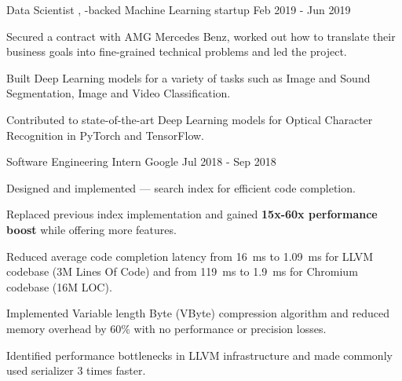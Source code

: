 \begin{cventries}
  \cventry
    {Data Scientist}
    {,
     -backed Machine Learning
     startup}
    {}
    {Feb 2019 - Jun 2019}
    {
      \begin{cvitems}
        \item Secured a contract with AMG Mercedes Benz, worked out how to
          translate their business goals into fine-grained technical problems
          and led the project.
        \item Built Deep Learning models for a variety of tasks such as Image
	  and Sound Segmentation, Image and Video Classification.
        \item Contributed to state-of-the-art Deep Learning models for Optical
          Character Recognition in PyTorch and TensorFlow.
      \end{cvitems}
    }

  \cventry
    {Software Engineering Intern}
    {Google}
    {}
    {Jul 2018 - Sep 2018}
    {
      \begin{cvitems}
        \item Designed and implemented
          --- search index for efficient code completion.
        \item Replaced previous index implementation and gained
          \textbf{15x-60x performance boost} while offering more features.
        \item Reduced average code completion latency from \SI{16}{\ms} to
          \SI{1.09}{\ms} for LLVM codebase (3M Lines Of Code) and from
          \SI{119}{\ms} to \SI{1.9}{\ms} for Chromium codebase (16M LOC).
        \item Implemented Variable length Byte (VByte) compression algorithm
	  and reduced memory overhead by 60\% with no performance or precision
	  losses.
        \item Identified performance bottlenecks in LLVM infrastructure and made
	  commonly used serializer 3 times faster.
      \end{cvitems}
    }


\end{cventries}
